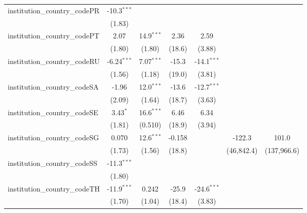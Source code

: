 \begin{tabular}{lcccccc}
   institution\_country\_codePR          & -10.3$^{***}$ &               &               &               &              &   \\   
                                         & (1.83)        &               &               &               &              &   \\   
   institution\_country\_codePT          & 2.07          & 14.9$^{***}$  & 2.36          & 2.59          &              &   \\   
                                         & (1.80)        & (1.80)        & (18.6)        & (3.88)        &              &   \\   
   institution\_country\_codeRU          & -6.24$^{***}$ & 7.07$^{***}$  & -15.3         & -14.1$^{***}$ &              &   \\   
                                         & (1.56)        & (1.18)        & (19.0)        & (3.81)        &              &   \\   
   institution\_country\_codeSA          & -1.96         & 12.0$^{***}$  & -13.6         & -12.7$^{***}$ &              &   \\   
                                         & (2.09)        & (1.64)        & (18.7)        & (3.63)        &              &   \\   
   institution\_country\_codeSE          & 3.43$^{*}$    & 16.6$^{***}$  & 6.46          & 6.34          &              &   \\   
                                         & (1.81)        & (0.510)       & (18.9)        & (3.94)        &              &   \\   
   institution\_country\_codeSG          & 0.070         & 12.6$^{***}$  & -0.158        &               & -122.3       & 101.0\\   
                                         & (1.73)        & (1.56)        & (18.8)        &               & (46,842.4)   & (137,966.6)\\   
   institution\_country\_codeSS          & -11.3$^{***}$ &               &               &               &              &   \\   
                                         & (1.80)        &               &               &               &              &   \\   
   institution\_country\_codeTH          & -11.9$^{***}$ & 0.242         & -25.9         & -24.6$^{***}$ &              &   \\   
                                         & (1.70)        & (1.04)        & (18.4)        & (3.83)        &              &   \\   

\end{tabular}
